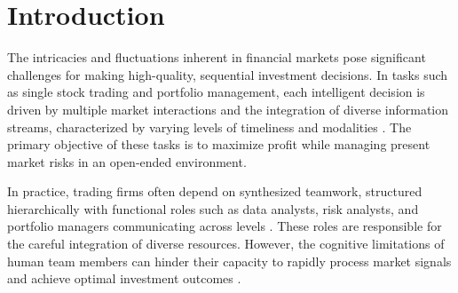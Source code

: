 \section{Introduction}

The intricacies and fluctuations inherent in financial markets pose significant challenges for making high-quality, sequential investment decisions. In tasks such as single stock trading and portfolio management, each intelligent decision is driven by multiple market interactions and the integration of diverse information streams, characterized by varying levels of timeliness and modalities \cite{markowitz1952portfolio, dang2019squawk}. The primary objective of these tasks is to maximize profit while managing present market risks in an open-ended environment.

In practice, trading firms often depend on synthesized teamwork, structured hierarchically with functional roles such as data analysts, risk analysts, and portfolio managers communicating across levels \cite{maginn2007managing, radner1993organization}. These roles are responsible for the careful integration of diverse resources. However, the cognitive limitations of human team members can hinder their capacity to rapidly process market signals and achieve optimal investment outcomes \cite{miller1956magical}.

